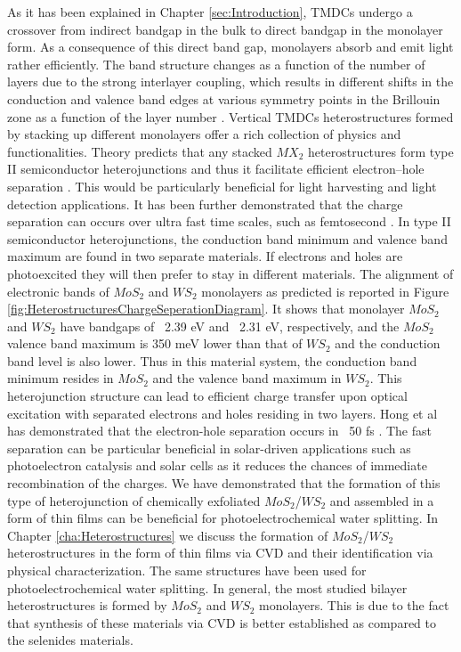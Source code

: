 As it has been explained in Chapter \ref{sec:Introduction}, TMDCs undergo a crossover from indirect bandgap in the bulk to direct bandgap in the monolayer form. As a consequence of this direct band gap, monolayers absorb and emit light rather efficiently. The band structure changes as a function of the number of layers due to the strong interlayer coupling, which results in different shifts in the conduction and valence band edges at various symmetry points in the Brillouin zone as a function of the layer number \cite{WS2BandStructureSimulation}. Vertical TMDCs heterostructures formed by stacking up different monolayers offer a rich collection of physics and functionalities. Theory predicts that any stacked $MX_2$ heterostructures form type II semiconductor heterojunctions and thus it facilitate efficient electron–hole separation \cite{Amin2015}. This would be particularly beneficial for light harvesting and light detection applications. It has been further demonstrated that the charge separation can occurs over ultra fast time scales, such as femtosecond \cite{Hong2014}.
In type II semiconductor heterojunctions, the conduction band minimum and valence band maximum are found in two separate materials. If electrons and holes are photoexcited they will then prefer to stay in different materials. The alignment of electronic bands of $MoS_2$ and $WS_2$ monolayers as predicted \cite{Gong2013} is reported in Figure \ref{fig:HeterostructuresChargeSeperationDiagram}. It shows that monolayer $MoS_2$ and $WS_2$ have bandgaps of ~2.39 eV and ~2.31 eV, respectively, and the $MoS_2$ valence band maximum is 350 meV lower than that of $WS_2$ and the conduction band level is also lower. Thus in this material system, the conduction band minimum resides in $MoS_2$ and the valence band maximum in $WS_2$. This heterojunction structure can lead to efficient charge transfer upon optical excitation with separated electrons and holes residing in two layers. Hong et al has demonstrated that the electron-hole separation occurs in ~50 fs \cite{Hong2014}. The fast separation can be particular beneficial in solar-driven applications such as photoelectron catalysis and solar cells as it reduces the chances of immediate recombination of the charges.
We have demonstrated that the formation of this type of heterojunction of chemically exfoliated $MoS_2$/$WS_2$ and assembled in a form of thin films can be beneficial for photoelectrochemical water splitting. In Chapter \ref{cha:Heterostructures} we discuss the formation of $MoS_2$/$WS_2$ heterostructures in the form of thin films via CVD and their identification via physical characterization. The same structures have been used for photoelectrochemical water splitting. In general, the most studied bilayer heterostructures is formed by $MoS_2$ and $WS_2$ monolayers. This is due to the fact that synthesis of these materials via CVD is better established as compared to the selenides materials. 


